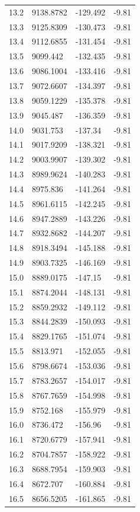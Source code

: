 \begin{table}[H]
\begin{tabular}{llll}
13.2 & 9138.8782 & -129.492 & -9.81 \\
13.3 & 9125.8309 & -130.473 & -9.81 \\
13.4 & 9112.6855 & -131.454 & -9.81 \\
13.5 & 9099.442 & -132.435 & -9.81 \\
13.6 & 9086.1004 & -133.416 & -9.81 \\
13.7 & 9072.6607 & -134.397 & -9.81 \\
13.8 & 9059.1229 & -135.378 & -9.81 \\
13.9 & 9045.487 & -136.359 & -9.81 \\
14.0 & 9031.753 & -137.34 & -9.81 \\
14.1 & 9017.9209 & -138.321 & -9.81 \\
14.2 & 9003.9907 & -139.302 & -9.81 \\
14.3 & 8989.9624 & -140.283 & -9.81 \\
14.4 & 8975.836 & -141.264 & -9.81 \\
14.5 & 8961.6115 & -142.245 & -9.81 \\
14.6 & 8947.2889 & -143.226 & -9.81 \\
14.7 & 8932.8682 & -144.207 & -9.81 \\
14.8 & 8918.3494 & -145.188 & -9.81 \\
14.9 & 8903.7325 & -146.169 & -9.81 \\
15.0 & 8889.0175 & -147.15 & -9.81 \\
15.1 & 8874.2044 & -148.131 & -9.81 \\
15.2 & 8859.2932 & -149.112 & -9.81 \\
15.3 & 8844.2839 & -150.093 & -9.81 \\
15.4 & 8829.1765 & -151.074 & -9.81 \\
15.5 & 8813.971 & -152.055 & -9.81 \\
15.6 & 8798.6674 & -153.036 & -9.81 \\
15.7 & 8783.2657 & -154.017 & -9.81 \\
15.8 & 8767.7659 & -154.998 & -9.81 \\
15.9 & 8752.168 & -155.979 & -9.81 \\
16.0 & 8736.472 & -156.96 & -9.81 \\
16.1 & 8720.6779 & -157.941 & -9.81 \\
16.2 & 8704.7857 & -158.922 & -9.81 \\
16.3 & 8688.7954 & -159.903 & -9.81 \\
16.4 & 8672.707 & -160.884 & -9.81 \\
16.5 & 8656.5205 & -161.865 & -9.81 \\

\end{tabular}
\end{table}
